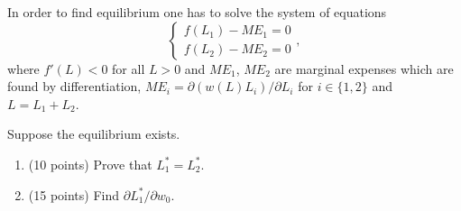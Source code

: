 \begin{enumerate}
  In order to find equilibrium one has to solve the system of equations
  \[
  \begin{cases}
    f(L_1) - ME_1 = 0 \\
    f(L_2) - ME_2 = 0
  \end{cases},
  \]
  where $f'(L)<0$ for all $L>0$ 
  and $ME_1$, $ME_2$ are marginal expenses which are found by differentiation, 
  $ME_i = \partial (w(L)L_i)/\partial L_i$ for $i \in \{1, 2\}$ and $L = L_1 + L_2$. 
  
  Suppose the equilibrium exists.
  \begin{enumerate}
    \item (10 points) Prove that $L_1^*=L_2^*$.
    \item (15 points) Find $\partial L_1^*/\partial w_0$.
  \end{enumerate}
  
  \end{enumerate}
  
  